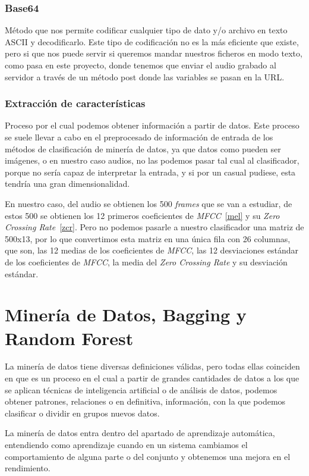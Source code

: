 \subsubsection{Base64}
Método que nos permite codificar cualquier tipo de dato y/o archivo en texto ASCII y decodificarlo. Este tipo de codificación no es la más eficiente que existe, pero si que nos puede servir si queremos mandar nuestros ficheros en modo texto, como pasa en este proyecto, donde tenemos que enviar el audio grabado al servidor a través de un método post donde las variables se pasan en la URL.
\subsubsection{Extracción de características}
Proceso por el cual podemos obtener información a partir de datos. Este proceso se suele llevar a cabo en el preprocesado de información de entrada de los métodos de clasificación de minería de datos, ya que datos como pueden ser imágenes, o en nuestro caso audios, no las podemos pasar tal cual al clasificador, porque no sería capaz de interpretar la entrada, y si por un casual pudiese, esta tendría una gran dimensionalidad.

En nuestro caso, del audio se obtienen los 500 \textit{frames} que se van a estudiar, de estos 500 se obtienen los 12 primeros coeficientes de \textit{MFCC}~\ref{mel} y su \textit{Zero Crossing Rate}~\ref{zcr}. Pero no podemos pasarle a nuestro clasificador una matriz de 500x13, por lo que convertimos esta matriz en una única fila con 26 columnas, que son, las 12 medias de los coeficientes de \textit{MFCC}, las 12 desviaciones estándar de los coeficientes de \textit{MFCC}, la media del \textit{Zero Crossing Rate} y su desviación estándar.

\section{Minería de Datos, Bagging y Random Forest}
La minería de datos tiene diversas definiciones válidas, pero todas ellas coinciden en que es un proceso en el cual a partir de grandes cantidades de datos a los que se aplican técnicas de inteligencia artificial o de análisis de datos, podemos obtener patrones, relaciones o en definitiva, información, con la que podemos clasificar o dividir en grupos nuevos datos.

La minería de datos entra dentro del apartado de aprendizaje automática, entendiendo como aprendizaje cuando en un sistema cambiamos el comportamiento de alguna parte o del conjunto y obtenemos una mejora en el rendimiento.

